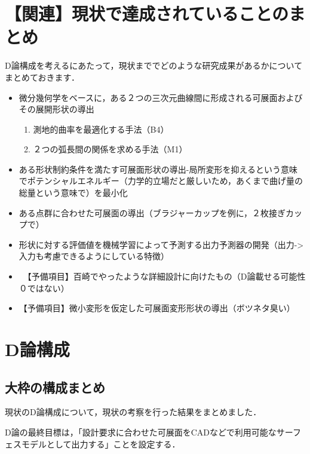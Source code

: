 \documentclass[11pt]{jsarticle}
\begin{document}
	\section{【関連】現状で達成されていることのまとめ}
		D論構成を考えるにあたって，現状まででどのような研究成果があるかについてまとめておきます．
		\begin{itemize}
			\item 微分幾何学をベースに，ある２つの三次元曲線間に形成される可展面およびその展開形状の導出
				\begin{enumerate}
					\item 測地的曲率を最適化する手法（B4）
					\item ２つの弧長間の関係を求める手法（M1）
				\end{enumerate}
			\item ある形状制約条件を満たす可展面形状の導出-局所変形を抑えるという意味でポテンシャルエネルギー（力学的立場だと厳しいため，あくまで曲げ量の総量という意味で）を最小化
			\item ある点群に合わせた可展面の導出（ブラジャーカップを例に，２枚接ぎカップで）
			\item 形状に対する評価値を機械学習によって予測する出力予測器の開発（出力->入力も考慮できるようにしている特徴）
			\item　【予備項目】百崎でやったような詳細設計に向けたもの（D論載せる可能性０ではない）
			\item 【予備項目】微小変形を仮定した可展面変形形状の導出（ボツネタ臭い）
		\end{itemize}
	\section{D論構成}
		\subsection{大枠の構成まとめ}
		現状のD論構成について，現状の考察を行った結果をまとめました．	
		
		D論の最終目標は，「設計要求に合わせた可展面をCADなどで利用可能なサーフェスモデルとして出力する」ことを設定する．
		
\end{document}
